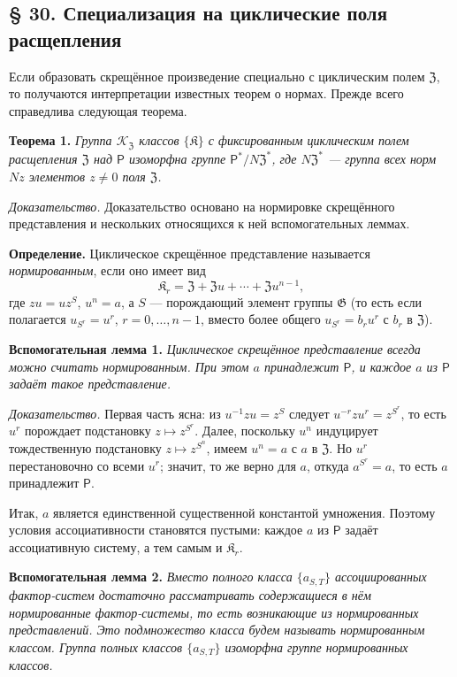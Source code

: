 \documentclass[11pt]{article}
\begin{document}
\subsection*{§ 30. Специализация на циклические поля расщепления}\label{spezialisierung-auf-zyklische-zerfaellungskoerper}

Если образовать скрещённое произведение специально с циклическим полем \(\mathfrak Z\), то получаются интерпретации известных теорем о нормах. Прежде всего справедлива следующая теорема.

\noindent\textbf{Теорема 1.} \emph{Группа \(\mathscr K_{\mathfrak Z}\) классов \(\{\mathfrak K\}\) с фиксированным циклическим полем расщепления \(\mathfrak Z\) над \(\mathsf{P}\) изоморфна группе \(\mathsf{P}^*/N\mathfrak Z^*\), где \(N\mathfrak Z^*\) --- группа всех норм \(Nz\) элементов \(z\neq0\) поля \(\mathfrak Z\).}

\noindent\emph{Доказательство.} Доказательство основано на нормировке скрещённого представления и нескольких относящихся к ней вспомогательных леммах.

\noindent\textbf{Определение.} Циклическое скрещённое представление называется \emph{нормированным}, если оно имеет вид
\[
\mathfrak K_r=\mathfrak Z+\mathfrak Zu+\cdots+\mathfrak Zu^{n-1},
\]
где \(zu=uz^S\), \(u^n=a\), а \(S\) --- порождающий элемент группы \(\mathfrak G\) (то есть если полагается \(u_{S^r}=u^r\), \(r=0,\ldots,n-1\), вместо более общего \(u_{S^r}=b_ru^r\) с \(b_r\) в \(\mathfrak Z\)).

\noindent\textbf{Вспомогательная лемма 1.} \emph{Циклическое скрещённое представление всегда можно считать нормированным. При этом \(a\) принадлежит \(\mathsf{P}\), и каждое \(a\) из \(\mathsf{P}\) задаёт такое представление.}

\noindent\emph{Доказательство.} Первая часть ясна: из \(u^{-1}zu=z^S\) следует \(u^{-r}zu^r=z^{S^r}\), то есть \(u^r\) порождает подстановку \(z\mapsto z^{S^r}\). Далее, поскольку \(u^n\) индуцирует тождественную подстановку \(z\mapsto z^{S^n}\), имеем \(u^n=a\) с \(a\) в \(\mathfrak Z\). Но \(u^r\) перестановочно со всеми \(u^r\); значит, то же верно для \(a\), откуда \(a^{S^r}=a\), то есть \(a\) принадлежит \(\mathsf{P}\).

Итак, \(a\) является единственной существенной константой умножения. Поэтому условия ассоциативности становятся пустыми: каждое \(a\) из \(\mathsf{P}\) задаёт ассоциативную систему, а тем самым и \(\mathfrak K_r\).

\noindent\textbf{Вспомогательная лемма 2.} \emph{Вместо полного класса \(\{a_{S,T}\}\) ассоциированных фактор-систем достаточно рассматривать содержащиеся в нём нормированные фактор-системы, то есть возникающие из нормированных представлений. Это подмножество класса будем называть нормированным классом. Группа полных классов \(\{a_{S,T}\}\) изоморфна группе нормированных классов.}
\end{document}
